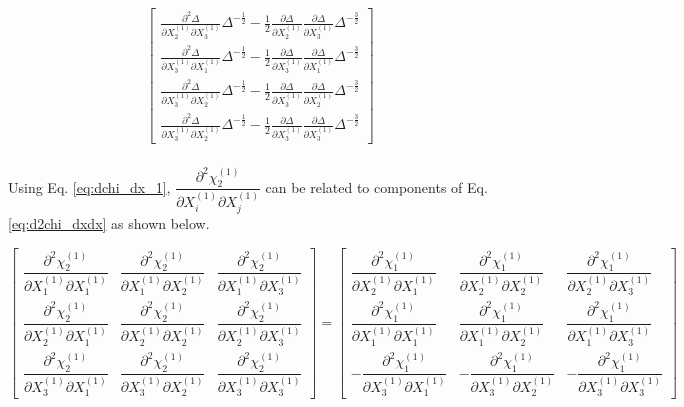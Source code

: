 \documentclass[12pt]{amsart}
\begin{document}
\begin{equation}
\begin{split}
\begin{bmatrix}
      \frac{\partial^2\Delta}{\partial X_2^{(1)} \partial X_3^{(1)}} \Delta^{-\frac{1}{2}} - \frac{1}{2}\frac{\partial\Delta}{\partial X_2^{(1)}} \frac{\partial\Delta}{\partial X_3^{(1)}} \Delta^{-\frac{3}{2}}\\
      \frac{\partial^2\Delta}{\partial X_3^{(1)} \partial X_1^{(1)}} \Delta^{-\frac{1}{2}} - \frac{1}{2}\frac{\partial\Delta}{\partial X_3^{(1)}} \frac{\partial\Delta}{\partial X_1^{(1)}} \Delta^{-\frac{3}{2}}\\
      \frac{\partial^2\Delta}{\partial X_3^{(1)} \partial X_2^{(1)}} \Delta^{-\frac{1}{2}} - \frac{1}{2}\frac{\partial\Delta}{\partial X_3^{(1)}} \frac{\partial\Delta}{\partial X_2^{(1)}} \Delta^{-\frac{3}{2}}\\
      \frac{\partial^2\Delta}{\partial X_3^{(1)} \partial X_2^{(1)}} \Delta^{-\frac{1}{2}} - \frac{1}{2}\frac{\partial\Delta}{\partial X_3^{(1)}} \frac{\partial\Delta}{\partial X_3^{(1)}} \Delta^{-\frac{3}{2}}
    \end{bmatrix}\\
  \end{split}
\end{equation}

Using Eq. \ref{eq:dchi_dx_1}, $\dfrac{\partial^2\chi_2^{(1)}}{\partial X_i^{(1)} \partial X_j^{(1)}}$ can be related to components of Eq. \ref{eq:d2chi_dxdx} as shown below.

\begin{equation}
  \label{eq:d2chi_dxdx_2}
  \begin{bmatrix}
    \dfrac{\partial^2\chi^{(1)}_2}{\partial X^{(1)}_1\partial X^{(1)}_1}&\dfrac{\partial^2\chi^{(1)}_2}{\partial X^{(1)}_1\partial X^{(1)}_2}&\dfrac{\partial^2\chi^{(1)}_2}{\partial X^{(1)}_1\partial X^{(1)}_3}\\
    \dfrac{\partial^2\chi^{(1)}_2}{\partial X^{(1)}_2\partial X^{(1)}_1}&\dfrac{\partial^2\chi^{(1)}_2}{\partial X^{(1)}_2\partial X^{(1)}_2}&\dfrac{\partial^2\chi^{(1)}_2}{\partial X^{(1)}_2\partial X^{(1)}_3}\\
    \dfrac{\partial^2\chi^{(1)}_2}{\partial X^{(1)}_3\partial X^{(1)}_1}&\dfrac{\partial^2\chi^{(1)}_2}{\partial X^{(1)}_3\partial X^{(1)}_2}&\dfrac{\partial^2\chi^{(1)}_2}{\partial X^{(1)}_3\partial X^{(1)}_3}
  \end{bmatrix}
  =
  \begin{bmatrix}
    \dfrac{\partial^2\chi^{(1)}_1}{\partial X^{(1)}_2\partial X^{(1)}_1}&\dfrac{\partial^2\chi^{(1)}_1}{\partial X^{(1)}_2\partial X^{(1)}_2}&\dfrac{\partial^2\chi^{(1)}_1}{\partial X^{(1)}_2\partial X^{(1)}_3}\\
    \dfrac{\partial^2\chi^{(1)}_1}{\partial X^{(1)}_1\partial X^{(1)}_1}&\dfrac{\partial^2\chi^{(1)}_1}{\partial X^{(1)}_1\partial X^{(1)}_2}&\dfrac{\partial^2\chi^{(1)}_1}{\partial X^{(1)}_1\partial X^{(1)}_3}\\
   -\dfrac{\partial^2\chi^{(1)}_1}{\partial X^{(1)}_3\partial X^{(1)}_1}&-\dfrac{\partial^2\chi^{(1)}_1}{\partial X^{(1)}_3\partial X^{(1)}_2}&-\dfrac{\partial^2\chi^{(1)}_1}{\partial X^{(1)}_3\partial X^{(1)}_3}
  \end{bmatrix}
\end{equation}
\end{document}
